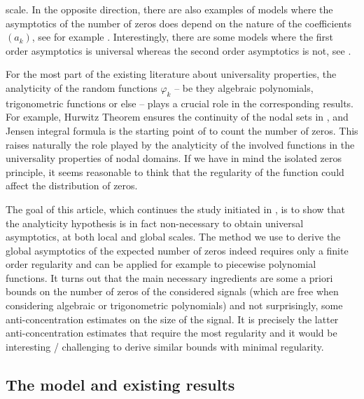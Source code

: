 \documentclass{svproc}
\begin{document}
scale. 
In the opposite direction, there are also examples of models where the asymptotics of the number of zeros does depend on the nature of the coefficients $(a_k)$, see for example \cite{Pir19a,Pir19b,Pau20,APP22}. Interestingly, there are some models where the first order asymptotics is universal whereas the second order asymptotics is not, see \cite{BCP18,DNN20,AP23}. 
\par
\medskip
For the most part of the existing literature about universality properties, the analyticity of the random functions $\varphi_k$ -- be they algebraic polynomials, trigonometric functions or else -- plays a crucial role in the corresponding results.  For example, Hurwitz Theorem ensures the continuity of the nodal sets in \cite{IKM16}, and Jensen integral formula is the starting point of \cite{NV18} to count the number of zeros. This raises naturally the role played by the analyticity of the involved functions in the universality properties of nodal domains. If we have in mind the isolated zeros principle, it seems reasonable to think that the regularity of the function could affect the distribution of zeros.
\par
\medskip
The goal of this article, which continues the study initiated in \cite{AP20IMRN}, is to show that the analyticity hypothesis is in fact non-necessary to obtain universal asymptotics, at both local and global scales. The method we use to derive the global asymptotics of the expected number of zeros indeed requires only a finite order regularity and can be applied for example to piecewise polynomial functions. It turns out that the main necessary ingredients are some a priori bounds on the number of zeros of the considered signals (which are free when considering algebraic or trigonometric polynomials) and not surprisingly, some anti-concentration estimates on the size of the signal. It is precisely the latter anti-concentration estimates that require the most regularity and it would be interesting / challenging to derive similar bounds with minimal regularity.

\subsection{The model and existing results}
\end{document}
